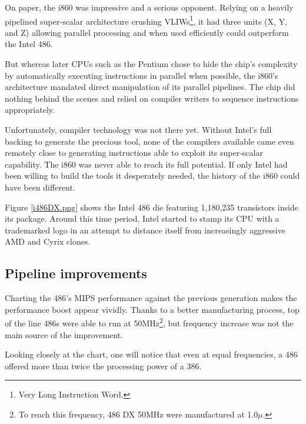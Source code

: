 On paper, the i860 was impressive and a serious opponent. Relying on a heavily pipelined super-scalar architecture crushing VLIWs\footnote{Very Long Instruction Word.}, it had three units (X, Y, and Z) allowing parallel processing and when used efficiently could outperform the Intel 486.\\
\par
But whereas later CPUs such as the Pentium chose to hide the chip's complexity by automatically executing instructions in parallel when possible, the i860's architecture mandated direct manipulation of its parallel pipelines. The chip did nothing behind the scenes and relied on compiler writers to sequence instructions appropriately.\\
\par
Unfortunately, compiler technology was not there yet. Without Intel's full backing to generate the precious tool, none of the compilers available came even remotely close to generating instructions able to exploit its super-scalar capability. The i860 was never able to reach its full potential. If only Intel had been willing to build the tools it desperately needed, the history of the i860 could have been different.\\
\par
\par
{}
\par
Figure \ref{i486DX.png} shows the Intel 486 die featuring 1,180,235 transistors inside its package. Around this time period, Intel started to stamp its CPU with a trademarked logo in an attempt to distance itself from increasingly aggressive AMD and Cyrix clones.\\
\par
{}

\par
\subsection{Pipeline improvements}
Charting the 486's MIPS performance against the previous generation makes the performance boost appear vividly. Thanks to a better manufacturing process, top of the line 486s were able to run at 50MHz\footnote{To reach this frequency, 486 DX 50MHz were manufactured at 1.0$\mu$.}, but frequency increase was not the main source of the improvement.\\
\par
 Looking closely at the chart, one will notice that even at equal frequencies, a 486 offered more than twice the processing power of a 386.\\

